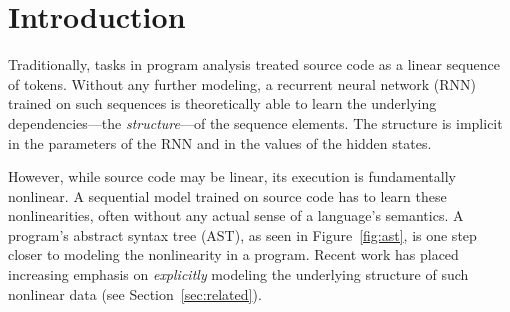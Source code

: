 




		








\section{Introduction}\label{sec:introduction}

Traditionally, tasks in program analysis treated source code as a linear 
sequence of tokens.  Without any further modeling, a recurrent neural network 
(RNN) trained on such sequences is theoretically able to learn the underlying 
dependencies---the \textit{structure}---of the sequence elements.  The structure 
is implicit in the parameters of the RNN and in the values of the hidden states.


However, while source code may be linear, its execution is fundamentally 
nonlinear. A sequential model trained on source code has to learn these 
nonlinearities, often without any actual sense of a language's semantics.  A 
program's abstract syntax tree (AST), as seen in Figure~\ref{fig:ast}, is one 
step closer to modeling the nonlinearity in a program. Recent work has placed 
increasing emphasis on \textit{explicitly} modeling the underlying structure of 
such nonlinear data (see Section~\ref{sec:related}).


